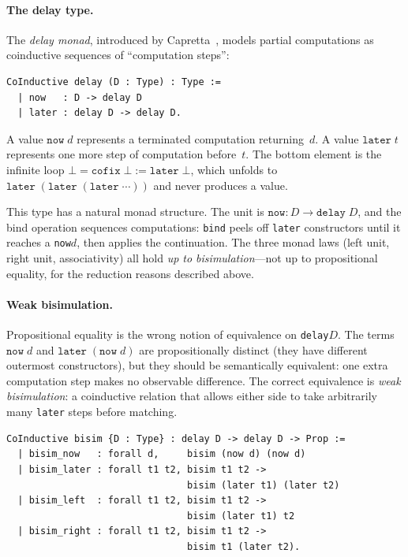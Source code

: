 \paragraph{The delay type.}
The \emph{delay monad}, introduced by
Capretta~\cite{Capretta2005}, models partial computations as
coinductive sequences of ``computation steps'':

\begin{lstlisting}[caption={The coinductive delay type
  (\texttt{LiftMonad.v}).},
                    label={lst:delay}]
CoInductive delay (D : Type) : Type :=
  | now   : D -> delay D
  | later : delay D -> delay D.
\end{lstlisting}

\noindent
A value $\texttt{now}\;d$ represents a terminated computation
returning~$d$.
A value $\texttt{later}\;t$ represents one more step of
computation before~$t$.
The bottom element is the infinite loop
$\bot = \texttt{cofix}\;\bot := \texttt{later}\;\bot$, which
unfolds to $\texttt{later}\;(\texttt{later}\;(\texttt{later}\;
\cdots))$ and never produces a value.

This type has a natural monad structure.
The unit is $\texttt{now} : D \to \texttt{delay}\;D$, and the bind
operation sequences computations:
\texttt{bind} peels off \texttt{later} constructors until it
reaches a \texttt{now}\;$d$, then applies the continuation.
The three monad laws (left unit, right unit, associativity) all hold
\emph{up to bisimulation}---not up to propositional equality, for
the reduction reasons described above.

\paragraph{Weak bisimulation.}
Propositional equality is the wrong notion of equivalence on
\texttt{delay}\;$D$.
The terms $\texttt{now}\;d$ and $\texttt{later}\;(\texttt{now}\;d)$
are propositionally distinct (they have different outermost
constructors), but they should be semantically equivalent: one extra
computation step makes no observable difference.
The correct equivalence is \emph{weak bisimulation}: a coinductive
relation that allows either side to take arbitrarily many
\texttt{later} steps before matching.

\begin{lstlisting}[caption={Weak bisimulation on \texttt{delay}
  (\texttt{LiftMonad.v}).},
                    label={lst:bisim}]
CoInductive bisim {D : Type} : delay D -> delay D -> Prop :=
  | bisim_now   : forall d,     bisim (now d) (now d)
  | bisim_later : forall t1 t2, bisim t1 t2 ->
                                bisim (later t1) (later t2)
  | bisim_left  : forall t1 t2, bisim t1 t2 ->
                                bisim (later t1) t2
  | bisim_right : forall t1 t2, bisim t1 t2 ->
                                bisim t1 (later t2).
\end{lstlisting}

